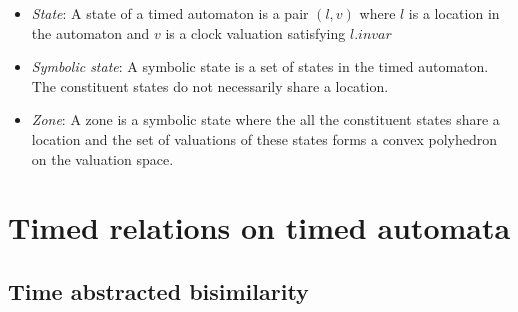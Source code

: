 \documentclass{article}
\begin{document}
\begin{itemize}

\item \emph{State}: A state of a timed automaton is a pair $(l, v)$
  where $l$ is a location in the automaton and $v$ is a clock
  valuation satisfying $l.invar$

\item \emph{Symbolic state}: A symbolic state is a set of states in
  the timed automaton. The constituent states do not necessarily share
  a location.

\item \emph{Zone}: A zone is a symbolic state where the all the
  constituent states share a location and the set of valuations of
  these states forms a convex polyhedron on the valuation space.

\end{itemize}

\section{Timed relations on timed automata}

\subsection{Time abstracted bisimilarity}
\end{document}
